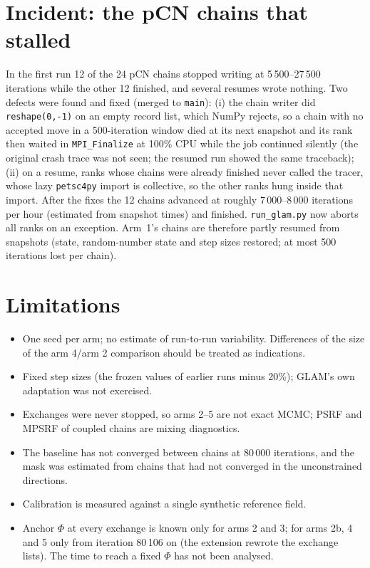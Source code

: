 \documentclass[11pt]{article}
\begin{document}
\section{Incident: the pCN chains that stalled}
In the first run 12 of the 24 pCN chains stopped writing at 5\,500--27\,500 iterations while the other 12 finished, and several resumes wrote nothing. Two defects were found and fixed (merged to \texttt{main}): (i) the chain writer did \texttt{reshape(0,-1)} on an empty record list, which NumPy rejects, so a chain with no accepted move in a 500-iteration window died at its next snapshot and its rank then waited in \texttt{MPI\_Finalize} at 100\% CPU while the job continued silently (the original crash trace was not seen; the resumed run showed the same traceback); (ii) on a resume, ranks whose chains were already finished never called the tracer, whose lazy \texttt{petsc4py} import is collective, so the other ranks hung inside that import. After the fixes the 12 chains advanced at roughly 7\,000--8\,000 iterations per hour (estimated from snapshot times) and finished. \texttt{run\_glam.py} now aborts all ranks on an exception. Arm~1's chains are therefore partly resumed from snapshots (state, random-number state and step sizes restored; at most 500 iterations lost per chain).

\section{Limitations}
\begin{itemize}
\item One seed per arm; no estimate of run-to-run variability. Differences of the size of the arm 4/arm 2 comparison should be treated as indications.
\item Fixed step sizes (the frozen values of earlier runs minus 20\%); GLAM's own adaptation was not exercised.
\item Exchanges were never stopped, so arms 2--5 are not exact MCMC; PSRF and MPSRF of coupled chains are mixing diagnostics.
\item The baseline has not converged between chains at 80\,000 iterations, and the mask was estimated from chains that had not converged in the unconstrained directions.
\item Calibration is measured against a single synthetic reference field.
\item Anchor $\Phi$ at every exchange is known only for arms 2 and 3; for arms 2b, 4 and 5 only from iteration 80\,106 on (the extension rewrote the exchange lists). The time to reach a fixed $\Phi$ has not been analysed.
\end{itemize}
\end{document}
